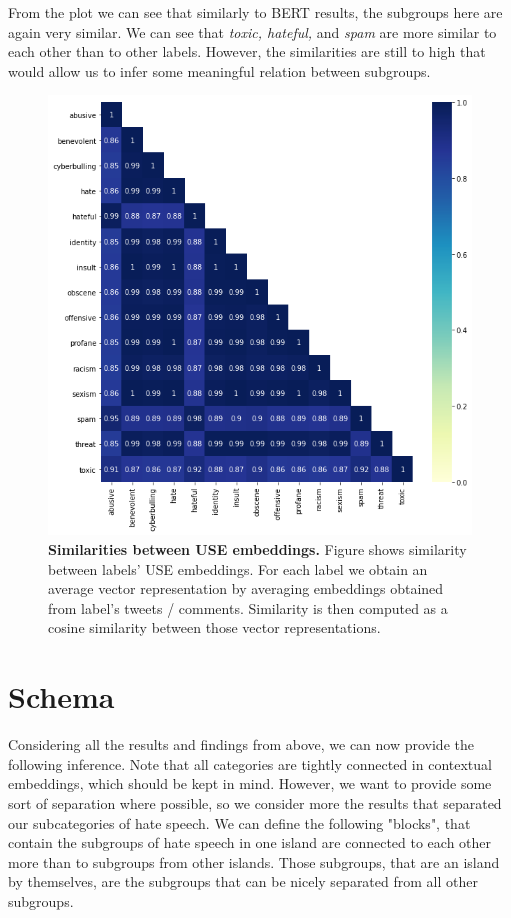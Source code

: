 \documentclass[fleqn,moreauthors,10pt]{ds_report}
\begin{document}
From the plot we can see that similarly to BERT results, the subgroups here are again very similar. We can see that \textit{toxic, hateful,} and \textit{spam} are more similar to each other than to other labels. However, the similarities are still to high that would allow us to infer some meaningful relation between subgroups.

\begin{figure}[htb]\centering
	\includegraphics[width=0.9\linewidth]{use_sim.png}
	\caption{\textbf{Similarities between USE embeddings.} Figure shows similarity between labels' USE embeddings. For each label we obtain an average vector representation by averaging embeddings obtained from label's tweets / comments. Similarity is then computed as a cosine similarity between those vector representations.}
	\label{fig:use_sim}
\end{figure}


\section{Schema}
\label{sec:schema}
Considering all the results and findings from above, we can now provide the following inference. Note that all categories are tightly connected in contextual embeddings, which should be kept in mind. However, we want to provide some sort of separation where possible, so we consider more the results that separated our subcategories of hate speech. We can define the following "blocks", that contain the subgroups of hate speech in one island are connected to each other more than to subgroups from other islands. Those subgroups, that are an island by themselves, are the subgroups that can be nicely separated from all other subgroups. 
\end{document}
